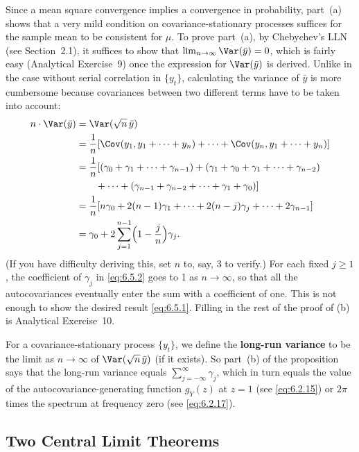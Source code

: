 Since a mean square convergence implies a convergence in probability, part~(a)
shows that a very mild condition on covariance-stationary processes suffices for
the sample mean to be consistent for $\mu$. To prove part~(a), by Chebychev's LLN
(see Section~2.1), it suffices to show that $\lim_{n \to \infty} \Var(\bar{y}) = 0$, which is fairly easy
(Analytical Exercise~9) once the expression for $\Var(\bar{y})$ is derived. Unlike in the case
without serial correlation in $\{y_t\}$, calculating the variance of $\bar{y}$ is more cumbersome
because covariances between two different terms have to be taken into account:
\begin{align}
  n \cdot \Var(\bar{y}) &= \Var(\sqrt{n}\,\bar{y}) \notag \\
  &= \frac{1}{n} [\Cov(y_1, y_1 + \cdots + y_n) + \cdots + \Cov(y_n, y_1 + \cdots + y_n)] \notag \\
  &= \frac{1}{n} [(\gamma_0 + \gamma_1 + \cdots + \gamma_{n-1}) + (\gamma_1 + \gamma_0 + \gamma_1 + \cdots + \gamma_{n-2}) \notag \\
  &\qquad + \cdots + (\gamma_{n-1} + \gamma_{n-2} + \cdots + \gamma_1 + \gamma_0)] \notag \\
  &= \frac{1}{n} [n\gamma_0 + 2(n-1)\gamma_1 + \cdots + 2(n-j)\gamma_j + \cdots + 2\gamma_{n-1}] \notag \\
  &= \gamma_0 + 2 \sum_{j=1}^{n-1} \Bigl(1 - \frac{j}{n}\Bigr) \gamma_j.
  \label{eq:6.5.2}
\end{align}
(If you have difficulty deriving this, set $n$ to, say, 3 to verify.) For each fixed $j \geq 1$,
the coefficient of $\gamma_j$ in \eqref{eq:6.5.2} goes to 1 as $n \to \infty$, so that all the autocovariances
eventually enter the sum with a coefficient of one. This is not enough to show the
desired result \eqref{eq:6.5.1}. Filling in the rest of the proof of (b) is Analytical Exercise~10.

For a covariance-stationary process $\{y_t\}$, we define the \textbf{long-run variance} to
be the limit as $n \to \infty$ of $\Var(\sqrt{n}\,\bar{y})$ (if it exists). So part~(b) of the proposition
says that the long-run variance equals $\sum_{j=-\infty}^{\infty} \gamma_j$, which in turn equals the value of
the autocovariance-generating function $g_Y(z)$ at $z = 1$ (see \eqref{eq:6.2.15}) or $2\pi$ times
the spectrum at frequency zero (see \eqref{eq:6.2.17}).

\subsection*{Two Central Limit Theorems}

